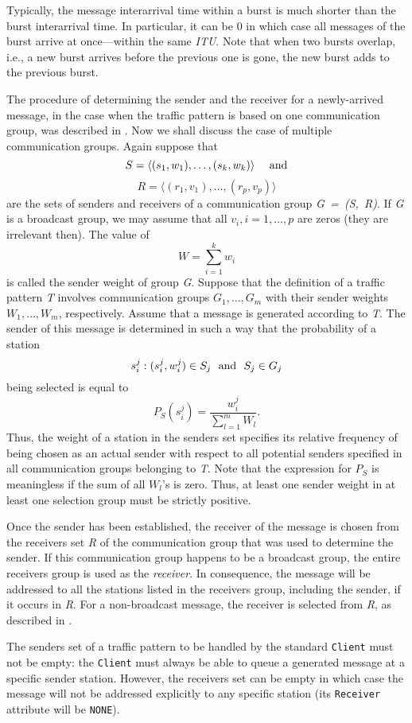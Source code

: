 Typically, the message interarrival time within a burst is much shorter than
the burst interarrival time.
In particular, it can be 0 in which case all messages of the burst arrive
at once---within the same {\em ITU}.
Note that when two bursts overlap, i.e., a new burst arrives before the
previous one is gone, the new burst adds to the previous burst.

The procedure of determining the sender and the receiver for a newly-arrived
message, in the case when the traffic pattern is based on one communication
group, was described in .
Now we shall discuss the case of multiple communication groups.
Again suppose that
\[
S = \langle (s_1, w_1), \ldots ,(s_k, w_k) \rangle~~~~{\rm and}
\]
\[
R = \langle (r_1, v_1) , \ldots ,(r_p, v_p) \rangle
\]
are the sets of senders
and receivers of a communication group {\em G~=~(S,~R)}.
If {\em G\/} is a broadcast group, we may assume that all
$v_i, i=1, \ldots , p$
are zeros (they are irrelevant then).
The value of
\[
W = \sum_{i=1}^k w_i
\]
is called the sender weight of group {\em G}.
Suppose that the definition of a traffic pattern {\em T\/} involves
communication groups
$G_1, \ldots , G_m$ with their
sender weights $W_1, \ldots , W_m$,
respectively.
Assume that a message is generated according to {\em T}.
The sender of this
message is determined in such a way that the probability of a
station
\[
s_i^j: (s_i^j, w_i^j) \in S_j ~~{\rm and}~~S_j \in G_j
\]
being selected is equal to
\[
P_S (s_i^j) = \frac{w_i^j}{\sum_{l=1}^m W_l}.
\]
Thus, the weight of a station in the senders set specifies its relative
frequency of being chosen as an actual sender with respect to all potential
senders specified in all communication groups belonging to {\em T}.
Note that the expression for
$P_S$
is meaningless if the sum of all $W_l$'s is zero.
Thus, at
least one sender weight in at least one selection group must be strictly
positive.

Once the sender has been established, the receiver of the message is chosen from
the receivers set {\em R\/} of the communication group that was used to determine
the sender.
If this communication group happens to be a broadcast group,
the entire receivers group is used as the {\em receiver}.
In consequence, the message will be addressed to all the stations
listed in the receivers group, including the sender, if it occurs in {\em R}.
For a non-broadcast message, the receiver is selected from {\em R}, as described in
.

The senders set of a traffic pattern to be handled by the standard {\tt Client}
must not be empty: the {\tt Client} must always be able to queue a generated
message at a specific sender station.
However, the receivers set can be empty in which case the message will not be
addressed explicitly to any specific station (its {\tt Receiver} attribute
will be {\tt NONE}).

